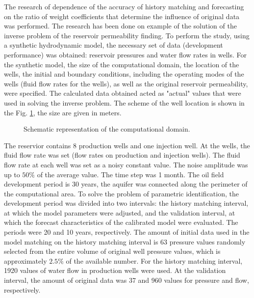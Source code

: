 \documentclass[
11pt,%
tightenlines,%
twoside,%
onecolumn,%
nofloats,%
nobibnotes,%
nofootinbib,%
superscriptaddress,%
noshowpacs,%
centertags]%
{revtex4}
\begin{document}
The research of dependence of the accuracy of history matching and forecasting on the ratio of weight coefficients that determine the influence of original data was performed. The research has been done on example of the solution of the inverse problem of the reservoir permeability finding. 
To perform the study, using a synthetic hydrodynamic model,
the necessary set of data (development performance) was obtained:
reservoir pressures and water flow rates in wells. For the synthetic
model, the size of the computational domain, the location of
the wells, the initial and boundary conditions, including the
operating modes of the wells (fluid flow rates for the wells), as
well as the original reservoir permeability, were specified. The
calculated data obtained acted as "actual" values that were used in
solving the inverse problem. The scheme of the well location is shown in the
Fig. \ref{fig:map}, the size are given in meters.
\begin{figure}
    \caption{Schematic representation of the computational domain.}
    \label{fig:map}
\end{figure}

The reservior contains 8 production wells and one injection well.
At the wells, the fluid flow rate was set (flow 
rates on production and injection wells). The fluid flow rate at each well was set 
as a noisy constant value. The noise
amplitude was up to $50\%$ of the average value. The time step was 1
month. The oil field development period is 30 years, the aquifer was
connected along the perimeter of the computational area. To solve
the problem of parametric identification, the development period was
divided into two intervals: the history matching interval, at which
the model parameters were adjusted, and the validation interval, at
which the forecast characteristics of the calibrated model were
evaluated. The periods were 20 and 10 years, respectively. The
amount of initial data used in the model matching on
the history matching interval is 63 pressure values randomly
selected from the entire volume of original well pressure values,
which is approximately $2.5\%$ of the available number. For the
history matching interval, 1920 values of water flow in production
wells were used. At the validation interval, the amount of original
data was 37 and 960 values for pressure and flow, respectively.
\end{document}
